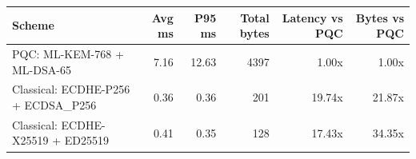 \begin{tabular}{lrrrrr}
\hline
Scheme & Avg ms & P95 ms & Total bytes & Latency vs PQC & Bytes vs PQC \\
\hline
PQC: ML-KEM-768 + ML-DSA-65 & 7.16 & 12.63 & 4397 & 1.00x & 1.00x \\
Classical: ECDHE-P256 + ECDSA\_P256 & 0.36 & 0.36 & 201 & 19.74x & 21.87x \\
Classical: ECDHE-X25519 + ED25519 & 0.41 & 0.35 & 128 & 17.43x & 34.35x \\
\hline
\end{tabular}
